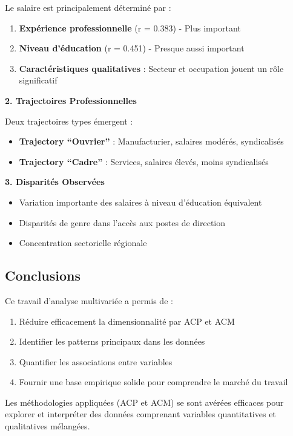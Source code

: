 \documentclass[12pt,a4paper]{report}
\begin{document}
Le salaire est principalement déterminé par :
\begin{enumerate}
    \item \textbf{Expérience professionnelle} (r = 0.383) - Plus important
    \item \textbf{Niveau d'éducation} (r = 0.451) - Presque aussi important
    \item \textbf{Caractéristiques qualitatives} : Secteur et occupation jouent un rôle significatif
\end{enumerate}

\textbf{2. Trajectoires Professionnelles}

Deux trajectoires types émergent :
\begin{itemize}
    \item \textbf{Trajectory ``Ouvrier''} : Manufacturier, salaires modérés, syndicalisés
    \item \textbf{Trajectory ``Cadre''} : Services, salaires élevés, moins syndicalisés
\end{itemize}

\textbf{3. Disparités Observées}

\begin{itemize}
    \item Variation importante des salaires à niveau d'éducation équivalent
    \item Disparités de genre dans l'accès aux postes de direction
    \item Concentration sectorielle régionale
\end{itemize}

\subsection{Conclusions}

Ce travail d'analyse multivariée a permis de :

\begin{enumerate}
    \item Réduire efficacement la dimensionnalité par ACP et ACM
    \item Identifier les patterns principaux dans les données
    \item Quantifier les associations entre variables
    \item Fournir une base empirique solide pour comprendre le marché du travail
\end{enumerate}

Les méthodologies appliquées (ACP et ACM) se sont avérées efficaces pour explorer et interpréter des données comprenant variables quantitatives et qualitatives mélangées.
\end{document}
